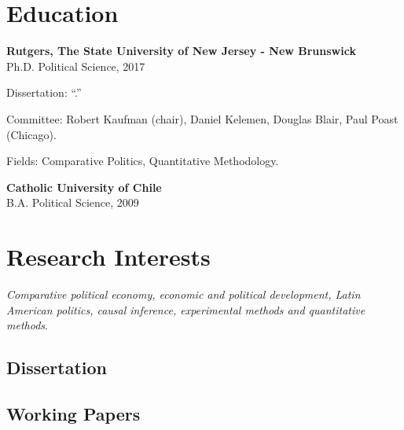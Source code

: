 \documentclass[letterpaper]{article}
\renewenvironment{itemize}{
  \begin{list}{}{
    \setlength{\leftmargin}{1.5em}
  }
}{
  \end{list}
}
\begin{document}
\section*{Education}

\begin{itemize}
  \item {\bf Rutgers, The State University of New Jersey - New Brunswick}\\
  Ph.D. Political Science, 2017
    	\begin{itemize}
      		\item[] Dissertation: ``{\unskip}.''
      		\item[] Committee: Robert Kaufman (chair), Daniel Kelemen, Douglas Blair, Paul Poast (Chicago).
          \item[] Fields: Comparative Politics, Quantitative Methodology.
		  \end{itemize}

\item {\bf Catholic University of Chile}\\
B.A. Political Science, 2009
\end{itemize}


\section*{Research Interests}

\emph{Comparative political economy, economic and political development, Latin American politics, causal inference, experimental methods and quantitative methods}.

\subsection*{Dissertation}

{\unskip}



\subsection*{Working Papers}
\end{document}

